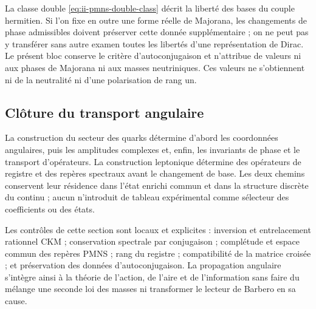 \begin{remark}
La classe double \eqref{eq:ii-pmns-double-class} décrit la liberté des
bases du couple hermitien. Si l'on fixe en outre une forme réelle de Majorana,
les changements de phase admissibles doivent préserver cette donnée supplémentaire ;
on ne peut pas y transférer sans autre examen toutes les libertés d'une représentation
de Dirac. Le présent bloc conserve le critère d'autoconjugaison et
n'attribue de valeurs ni aux phases de Majorana ni aux masses neutriniques. Ces valeurs
ne s'obtiennent ni de la neutralité ni d'une polarisation de rang un.
\end{remark}

\subsection{Clôture du transport angulaire}

La construction du secteur des quarks détermine d’abord les coordonnées angulaires, puis
les amplitudes complexes et, enfin, les invariants de phase et le
transport d’opérateurs. La construction leptonique détermine des opérateurs de
registre et des repères spectraux avant le changement de base. Les deux chemins
conservent leur résidence dans l’état enrichi commun et dans la structure
discrète du continu ; aucun n’introduit de tableau expérimental comme
sélecteur des coefficients ou des états.

Les contrôles de cette section sont locaux et explicites : inversion et
entrelacement rationnel CKM ; conservation spectrale par conjugaison ;
complétude et espace commun des repères PMNS ; rang du registre ;
compatibilité de la matrice croisée ; et préservation des données
d'autoconjugaison. La propagation angulaire s'intègre ainsi à la théorie de
l'action, de l'aire et de l'information sans faire du mélange une seconde loi des
masses ni transformer le lecteur de Barbero en sa cause.

\par\endgroup
